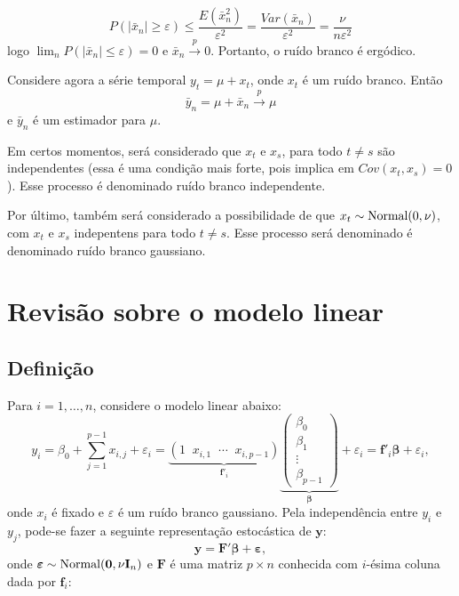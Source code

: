 \documentclass[
  letterpaper,
  DIV=11,
  numbers=noendperiod]{scrartcl}
\theoremstyle{plain}
\theoremstyle{plain}
\theoremstyle{definition}
\theoremstyle{definition}
\theoremstyle{remark}
\begin{document}
\[P\left(|\bar{x}_n|\geq\varepsilon\right)\leq \frac{E(\bar{x}_n^2)}{\varepsilon^2}=\frac{Var(\bar{x}_n)}{\varepsilon^2}=\frac{\nu}{n\varepsilon^2}\]
logo \(\lim_{n}P(|\bar{x}_n|\leq \varepsilon)=0\) e
\(\bar{x}_n\stackrel{p}{\rightarrow}0\). Portanto, o ruído branco é
ergódico.

Considere agora a série temporal \(y_t=\mu+x_t\), onde \(x_t\) é um
ruído branco. Então
\[\bar{y}_n=\mu+\bar{x}_n\stackrel{p}{\rightarrow}\mu\] e \(\bar{y}_n\)
é um estimador para \(\mu\).

Em certos momentos, será considerado que \(x_t\) e \(x_s\), para todo
\(t\neq s\) são independentes (essa é uma condição mais forte, pois
implica em \(Cov(x_t,x_s)=0\)). Esse processo é denominado ruído branco
independente.

Por último, também será considerado a possibilidade de que
\(x_t\sim\hbox{Normal}(0,\nu)\), com \(x_t\) e \(x_s\) indepentens para
todo \(t\neq s\). Esse processo será denominado é denominado ruído
branco gaussiano.


\hypertarget{revisuxe3o-sobre-o-modelo-linear}{%
\chapter{Revisão sobre o modelo
linear}\label{revisuxe3o-sobre-o-modelo-linear}}

\hypertarget{definiuxe7uxe3o}{%
\section{Definição}\label{definiuxe7uxe3o}}

Para \(i=1,\ldots,n\), considere o modelo linear abaixo:
\[y_i= \beta_0+\sum_{j=1}^{p-1}x_{i,j}+\varepsilon_i=\underbrace{ \left(1\;\;x_{i,1}\;\;\cdots\;\;x_{i,p-1}\right)}_\text{$\boldsymbol{f}'_i$}\underbrace{\left(\begin{array}{c}\beta_0 \\ \beta_1 \\ \vdots \\ \beta_{p-1} 
        \end{array}\right)}_\text{$\boldsymbol{\beta}$}+\varepsilon_i=\boldsymbol{f}'_i\boldsymbol{\beta}+\varepsilon_i,\]
onde \(x_i\) é fixado e \(\varepsilon\) é um ruído branco gaussiano.
Pela independência entre \(y_i\) e \(y_j\), pode-se fazer a seguinte
representação estocástica de \(\boldsymbol{y}\): \[\begin{equation}
        \boldsymbol{y}=\boldsymbol{F}'\boldsymbol{\beta} + \boldsymbol{\varepsilon},
        \end{equation}\] onde
\(\boldsymbol{\varepsilon}\sim\hbox{Normal}(\boldsymbol{0},\nu\textbf{I}_n)\)
e \(\boldsymbol{F}\) é uma matriz \(p\times n\) conhecida com
\(i\)-ésima coluna dada por \(\boldsymbol{f}_i\):
\end{document}
